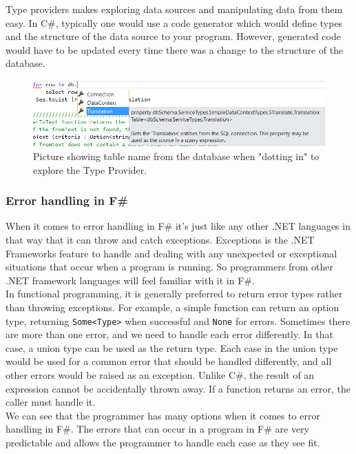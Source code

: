 \documentclass[12pt, a4paper]{article}
\newcommand{\code}[1]{{\small \texttt{#1}}}
\begin{document}
Type providers makes exploring data sources and manipulating data from them easy. In C\#, typically one would use a code generator which would define types and the structure of the data source to your program. However, generated code would have to be updated every time there was a change to the structure of the database.

\begin{figure}[!h]
    \includegraphics[width=\textwidth]{visualstudio1}
    \centering
    \caption{Picture showing table name from the database when "dotting in" to explore the Type Provider.}
    \label{fig:DotInTool}
\end{figure}

\newpage

\subsubsection{Error handling in F\#}
When it comes to error handling in F\# it's just like any other .NET languages in that way that it can throw and catch exceptions. Exceptions is the .NET Frameworks feature to handle and dealing with any unexpected or exceptional situations that occur when a program is running. So programmers from other .NET framework languages will feel familiar with it in F\#.\\

In functional programming, it is generally preferred to return error types rather than throwing exceptions. For example, a simple function can return an option type, returning \code{Some<Type>} when successful and \code{None} for errors. Sometimes there are more than one error, and we need to handle each error differently. In that case, a union type can be used as the return type. Each case in the union type would be used for a common error that should be handled differently, and all other errors would be raised as an exception. Unlike C\#, the result of an expression cannot be accidentally thrown away. If a function returns an error, the caller must handle it.\\

We can see that the programmer has many options when it comes to error handling in F\#. The errors that can occur in a program in F\# are very predictable and allows the programmer to handle each case as they see fit.
\end{document}
